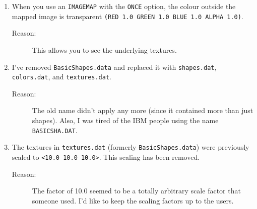 \begin{enumerate}
\item When you use an {\tt IMAGEMAP}
with the {\tt ONCE}
option, the colour outside the mapped image is transparent
{\tt (RED 1.0 GREEN 1.0 BLUE 1.0 ALPHA 1.0)}.
\begin{description}
\item[Reason:] This allows you to see the underlying textures.
\end{description}

\item I've removed {\tt BasicShapes.data} and replaced it with
{\tt shapes.dat}, {\tt colors.dat}, and {\tt textures.dat}.
\begin{description}
\item[Reason:] The old name didn't apply any more (since it contained
more than just shapes).  Also, I was tired of the IBM people using the
name {\tt BASICSHA.DAT}.
\end{description}

\item The textures in {\tt textures.dat} (formerly
{\tt BasicShapes.data}) were previously scaled to
{\tt <10.0 10.0 10.0>}.  This scaling has been removed.
\begin{description}
\item[Reason:] The factor of 10.0 seemed to be a totally arbitrary
scale factor that someone used.  I'd like to keep the scaling factors
up to the users.
\end{description}
\end{enumerate}
